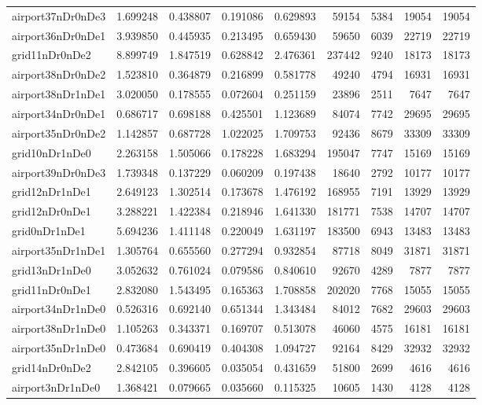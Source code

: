 \begin{longtable}{|l|r|r|r|r|r|r|r|r|}
airport37nDr0nDe3 & 1.699248 & 0.438807 & 0.191086 & 0.629893 & 59154 & 5384 & 19054 & 19054 \\
airport36nDr0nDe1 & 3.939850 & 0.445935 & 0.213495 & 0.659430 & 59650 & 6039 & 22719 & 22719 \\
grid11nDr0nDe2 & 8.899749 & 1.847519 & 0.628842 & 2.476361 & 237442 & 9240 & 18173 & 18173 \\
airport38nDr0nDe2 & 1.523810 & 0.364879 & 0.216899 & 0.581778 & 49240 & 4794 & 16931 & 16931 \\
airport38nDr1nDe1 & 3.020050 & 0.178555 & 0.072604 & 0.251159 & 23896 & 2511 & 7647 & 7647 \\
airport34nDr0nDe1 & 0.686717 & 0.698188 & 0.425501 & 1.123689 & 84074 & 7742 & 29695 & 29695 \\
airport35nDr0nDe2 & 1.142857 & 0.687728 & 1.022025 & 1.709753 & 92436 & 8679 & 33309 & 33309 \\
grid10nDr1nDe0 & 2.263158 & 1.505066 & 0.178228 & 1.683294 & 195047 & 7747 & 15169 & 15169 \\
airport39nDr0nDe3 & 1.739348 & 0.137229 & 0.060209 & 0.197438 & 18640 & 2792 & 10177 & 10177 \\
grid12nDr1nDe1 & 2.649123 & 1.302514 & 0.173678 & 1.476192 & 168955 & 7191 & 13929 & 13929 \\
grid12nDr0nDe1 & 3.288221 & 1.422384 & 0.218946 & 1.641330 & 181771 & 7538 & 14707 & 14707 \\
grid0nDr1nDe1 & 5.694236 & 1.411148 & 0.220049 & 1.631197 & 183500 & 6943 & 13483 & 13483 \\
airport35nDr1nDe1 & 1.305764 & 0.655560 & 0.277294 & 0.932854 & 87718 & 8049 & 31871 & 31871 \\
grid13nDr1nDe0 & 3.052632 & 0.761024 & 0.079586 & 0.840610 & 92670 & 4289 & 7877 & 7877 \\
grid11nDr0nDe1 & 2.832080 & 1.543495 & 0.165363 & 1.708858 & 202020 & 7768 & 15055 & 15055 \\
airport34nDr1nDe0 & 0.526316 & 0.692140 & 0.651344 & 1.343484 & 84012 & 7682 & 29603 & 29603 \\
airport38nDr1nDe0 & 1.105263 & 0.343371 & 0.169707 & 0.513078 & 46060 & 4575 & 16181 & 16181 \\
airport35nDr1nDe0 & 0.473684 & 0.690419 & 0.404308 & 1.094727 & 92164 & 8429 & 32932 & 32932 \\
grid14nDr0nDe2 & 2.842105 & 0.396605 & 0.035054 & 0.431659 & 51800 & 2699 & 4616 & 4616 \\
airport3nDr1nDe0 & 1.368421 & 0.079665 & 0.035660 & 0.115325 & 10605 & 1430 & 4128 & 4128 \\

\end{longtable}

